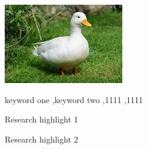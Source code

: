 \documentclass[review,12pt,authoryear]{elsarticle}
\begin{document}
\begin{linenumbers}
\begin{frontmatter}
      \begin{graphicalabstract}
        \includegraphics{graphical_abstract.jpeg}
      \end{graphicalabstract}

      \begin{keyword}
      keyword one \sep keyword two
       \sep 1111
       \sep 1111
      \end{keyword}
      

      \begin{highlights}
        \item Research highlight 1
        \item Research highlight 2
        \end{highlights}

      \end{frontmatter}



\end{linenumbers}
\end{document}

